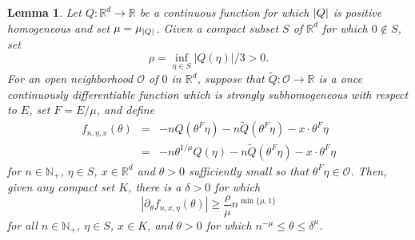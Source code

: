 \documentclass[11pt, letter]{book}
\newtheorem{lemma}[theorem]{Lemma}
\begin{document}
\begin{framed}
\begin{lemma}\label{lem:PhaseDerivativeEstimate}
Let $Q:\mathbb{R}^d\to\mathbb{R}$ be a continuous function for which $\abs{Q}$ is positive homogeneous and set $\mu=\mu_{\abs{Q}}$. Given a compact subset $S$ of $\mathbb{R}^d$ for which $0\notin S$, set
\begin{equation*}
    \rho=\inf_{\eta\in S}|Q(\eta)|/3>0.
\end{equation*}
For an open neighborhood $\mathcal{O}$ of $0$ in $\mathbb{R}^d$, suppose that $\widetilde{Q}:\mathcal{O}\to\mathbb{R}$ is a once continuously differentiable function which is strongly subhomogeneous with respect to $E$, set $F=E/\mu$, and define
\begin{eqnarray*}
f_{n,\eta,x}(\theta)&=&-nQ(\theta^F\eta)-n\widetilde{Q}(\theta^F\eta)-x\cdot \theta^F\eta\\
&=&-n\theta^{1/\mu}Q(\eta)-n\widetilde{Q}(\theta^{F}\eta)-x\cdot \theta^{F}\eta
\end{eqnarray*}
for $n\in\mathbb{N}_+$, $\eta\in S$, $x\in\mathbb{R}^d$ and $\theta>0$ sufficiently small so that $\theta^F\eta\in\mathcal{O}$. Then, given any compact set $K$, there is a $\delta>0$ for which
\begin{equation*}
    |\partial_\theta f_{n,x,\eta}(\theta)|\geq \frac{\rho}{\mu} n^{\min\{\mu,1\}}
\end{equation*}
for all $n\in\mathbb{N}_+$, $\eta\in S$,  $x\in K$, and $\theta>0$ for which $n^{-\mu}\leq \theta\leq \delta^\mu$.
\end{lemma}
\end{framed}
\end{document}
